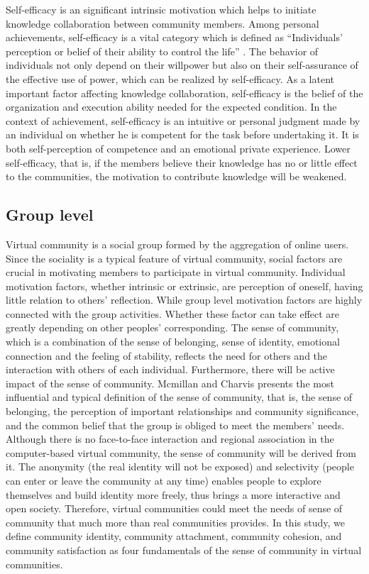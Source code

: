 \documentclass{elsarticle}
\begin{document}
Self-efficacy is an significant intrinsic motivation which
helps to initiate knowledge collaboration between community
members.  Among personal
achievements, self-efficacy is a vital category which is defined as
“Individuals’ perception or belief of their ability to control the
life” \cite{bundura1977slt}. The behavior of individuals not only depend
on their willpower but also on their self-assurance of the effective
use of power, which can be realized by self-efficacy. As a latent
important factor affecting knowledge collaboration, self-efficacy is
the belief of the organization and execution ability needed for the
expected condition. In the context of achievement, self-efficacy is an intuitive
or personal judgment made by an individual on whether he is competent
for the task before undertaking it. It is both self-perception of
competence and an emotional private experience. Lower self-efficacy,
that is, if the members  believe their knowledge has no
or little effect to the
communities, the motivation to contribute knowledge will be
weakened\cite{1631337020050301}\cite{Hsu2007}. 

\subsection{Group level}
\label{sec:group-level}

Virtual community is a social group formed by the aggregation of
online users. Since the sociality is a typical feature of virtual
community, social factors are crucial in motivating members to
participate in virtual community. Individual motivation factors,
whether intrinsic or extrinsic, are perception of oneself, having
little relation to others' reflection. While group level motivation
factors are highly connected with the group activities. Whether these
factor can take effect are greatly depending on other peoples' corresponding.  The sense of community, which is a
combination of the sense of belonging, sense of identity, emotional
connection and the feeling of stability, reflects the need for others
and the interaction with others of each individual. Furthermore, there
will be active impact of the sense of community. Mcmillan and Charvis
presents the most influential and typical definition of the sense of
community, that is, the sense of belonging, the perception of
important relationships and community significance, and the common
belief that the group is obliged to meet the members’
needs\cite{mcmillan1986scd}. Although there is no face-to-face
interaction and regional association in the computer-based virtual
community, the sense of community will be derived from it. The
anonymity (the real identity will not be exposed) and selectivity
(people can enter or leave the community at any time) enables people
to explore themselves and build identity more freely, thus brings a
more interactive and open society. Therefore, virtual communities
could meet the needs of sense of community that much more than real
communities provides. In this study, we define community identity, community attachment, community cohesion, and community satisfaction as four fundamentals of the sense of community in virtual communities.      
\end{document}
